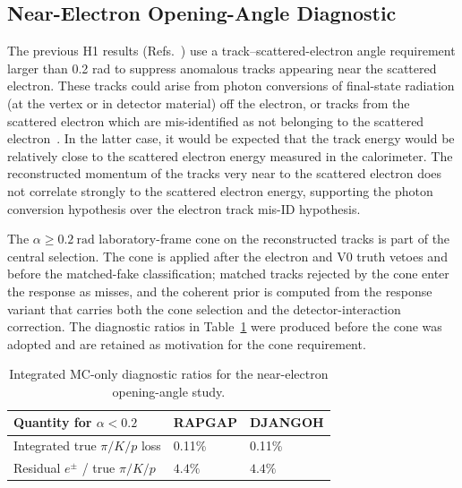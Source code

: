 \subsection{Near-Electron Opening-Angle Diagnostic}
\label{sec:syst:near-electron-alpha}
The previous H1 results (Refs.~\cite{H1:2013qsm,H1:2020zpd}) use a track--scattered-electron angle requirement larger than 0.2 rad to suppress anomalous tracks appearing near the scattered electron. These tracks could arise from photon conversions of final-state radiation (at the vertex or in detector material) off the electron, or tracks from the scattered electron which are mis-identified as not belonging to the scattered electron~\cite{Grebenyuk:2012thesis}. In the latter case, it would be expected that the track energy would be relatively close to the scattered electron energy measured in the calorimeter. The reconstructed momentum of the tracks very near to the scattered electron does not correlate strongly to the scattered electron energy, supporting the photon conversion hypothesis over the electron track mis-ID hypothesis.

The
$\alpha\ge0.2~\mathrm{rad}$ laboratory-frame cone on the reconstructed tracks is
part of the central selection.  The
cone is applied after the electron and V0 truth vetoes and before the
matched-fake classification; matched tracks rejected by the cone enter the
response as misses, and the coherent prior is computed from the response variant
that carries both the cone selection and the detector-interaction correction.
The diagnostic ratios in
Table~\ref{tab:syst:alpha-veto-integrated} were produced before the cone was
adopted and are retained as motivation for the cone requirement.

\begin{table}[h]
\centering
\small
\begin{tabular}{p{4.4cm}p{2cm}p{2cm}}
\toprule
Quantity for $\alpha<0.2$ & RAPGAP & DJANGOH \\
\midrule
Integrated true $\pi/K/p$ loss & 0.11\% & 0.11\% \\
Residual $e^{\pm}$ / true $\pi/K/p$
  & $4.4\%$
  & $4.4\%$ \\
\bottomrule
\end{tabular}
\caption{Integrated MC-only diagnostic ratios for the near-electron opening-angle
study.}
\label{tab:syst:alpha-veto-integrated}
\end{table}
